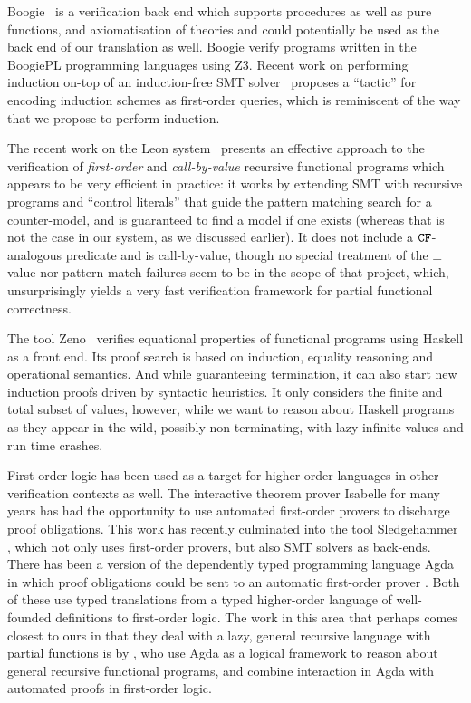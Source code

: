 Boogie~\cite{boogie} is a verification back end which supports procedures as well as
pure functions, and axiomatisation of theories and could potentially be used as the
back end of our translation as well. Boogie verify programs written in the BoogiePL
programming languages using Z3. Recent work on performing induction on-top of an
induction-free SMT solver~\cite{Leino:2012:AIS:2189257.2189278} proposes a ``tactic''
for encoding induction schemes as first-order queries, which is reminiscent of the way
that we propose to perform induction.

The recent work on the Leon system~\cite{Suter:2011:SMR:2041552.2041575} presents
an effective approach to the verification of {\em first-order} and {\em call-by-value}
recursive functional programs which appears to be very efficient in practice: it works
by extending SMT with recursive programs and ``control literals'' that guide the pattern
matching search for a counter-model, and is guaranteed to find a model if one exists
(whereas that is not the case in our system, as we discussed earlier). It does not include
a ${\tt CF}$-analogous predicate and is call-by-value, though no special treatment of the $\bot$
value nor pattern match failures seem to be in the scope of that project, which, unsurprisingly
yields a very fast verification framework for partial functional correctness.

The tool Zeno~\cite{zeno} verifies equational properties of functional
programs using Haskell as a front end. Its proof search is based on
induction, equality reasoning and operational semantics. And while
guaranteeing termination, it can also start new induction proofs
driven by syntactic heuristics. It only considers the finite and total
subset of values, however, while we want to reason about Haskell
programs as they appear in the wild, possibly non-terminating, with
lazy infinite values and run time crashes.


First-order logic has been used as a target for higher-order languages in other verification contexts as well.
The interactive theorem prover Isabelle for many years has had the opportunity to use
automated first-order provers to discharge proof obligations. This work has recently culminated into the tool
Sledgehammer \cite{Sledgehammer}, which not only uses first-order provers, but also SMT solvers as back-ends.
There has been a version of the dependently typed programming language Agda in which
proof obligations could be sent to an automatic first-order prover \cite{AgdaFOL}. Both of these use typed translations from a typed higher-order language of well-founded definitions to first-order logic. The work in this area that perhaps comes closest to ours in that they deal with a lazy, general recursive language with partial functions is by \citet{TypeTheoryFOL}, who use Agda as a logical framework to reason about general recursive functional programs, and combine interaction in Agda with automated proofs in first-order logic.

